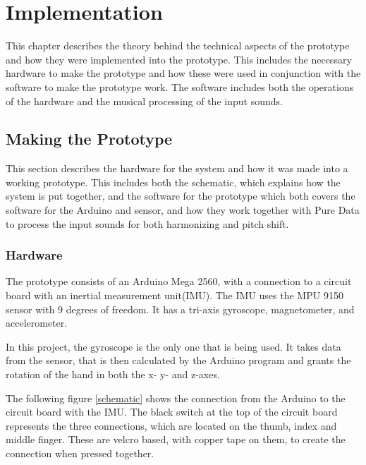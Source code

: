 \chapter{Implementation}

This chapter describes the theory behind the technical aspects of the prototype and how they were implemented into the prototype. This includes the necessary hardware to make the prototype and how these were used in conjunction with the software to make the prototype work. The software includes both the operations of the hardware and the musical processing of the input sounds.

\section{Making the Prototype}

This section describes the hardware for the system and how it was made into a working prototype. This includes both the schematic, which explains how the system is put together, and the software for the prototype which both covers the software for the Arduino and sensor, and how they work together with Pure Data to process the input sounds for both harmonizing and pitch shift.

\subsection{Hardware}

The prototype consists of an Arduino Mega 2560\citep{Arduino}, with a connection to a circuit board with an inertial measurement unit(IMU). 
The IMU uses the MPU 9150 sensor with 9 degrees of freedom\citep{MPU}. It has a tri-axis gyroscope, magnetometer, and accelerometer.

In this project, the gyroscope is the only one that is being used. It takes data from the sensor, that is then calculated by the Arduino program and grants the rotation of the hand in both the x- y- and z-axes.

The following figure \ref{schematic} shows the connection from the Arduino to the circuit board with the IMU. The black switch at the top of the circuit board
represents the three connections, which are located on the thumb, index and middle finger. These are velcro based, with copper tape on them, to create the connection when pressed together. \\

\begin{minipage}{\linewidth}%
\label{schematic}
\end{minipage}\\

